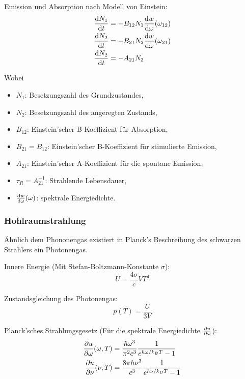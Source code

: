 			\noindent
			Emission und Absorption nach Modell von Einstein:
			\begin{equation}
				\begin{aligned}
					\frac{\mathrm{d} N_1}{\mathrm{d} t} &= -B_{12}N_1 \frac{\mathrm{d} w}{\mathrm{d} \omega}(\omega_{12}) \\
					\frac{\mathrm{d} N_2}{\mathrm{d} t} &= -B_{21}N_2 \frac{\mathrm{d} w}{\mathrm{d} \omega}(\omega_{21}) \\
					\frac{\mathrm{d} N_2}{\mathrm{d} t} &= -A_{21}N_2\\
				\end{aligned}
			\end{equation}

			\noindent
			Wobei
			\begin{itemize}
  				\setlength\itemsep{0pt}
				\item[] $N_1$: Besetzungszahl des Grundzustandes,
				\item[] $N_2$: Besetzungszahl des angeregten Zustands,
				\item[] $B_{12}$: Einstein'scher B-Koeffizient für Absorption,
				\item[] $B_{21} = B_{12}$: Einstein'scher B-Koeffizient für stimulierte Emission,
				\item[] $A_{21}$: Einstein'scher A-Koeffizient für die spontane Emission,
				\item[] $\tau_{R}=A_{21}^{-1}$: Strahlende Lebensdauer,
				\item[] $\frac{\mathrm{d} w}{\mathrm{d} \omega}(\omega)$: spektrale Energiedichte.
			\end{itemize}

		\subsubsection{Hohlraumstrahlung}
			\noindent
			Ähnlich dem Phononengas existiert in Planck's Beschreibung des schwarzen Strahlers ein Photonengas. \vsp

			\noindent
			Innere Energie (Mit Stefan-Boltzmann-Konstante $\sigma$):
			\begin{equation}
				U = \frac{4\sigma}{c} V T^4
			\end{equation}

			\noindent
			Zustandsgleichung des Photonengas:
			\begin{equation}
				p(T) = \frac{U}{3V}
			\end{equation}

			\noindent
			Planck'sches Strahlungsgesetz (Für die spektrale Energiedichte $\frac{\partial u}{\partial \omega}$):
			\begin{equation}
					\begin{aligned}
							\frac{\partial u}{\partial \omega}(\omega,T) &= \frac{\hbar \omega^3}{\pi^2 c^3} \frac{1}{e^{\hbar \omega / k_B T} - 1} \\
							\frac{\partial u}{\partial \nu} (\nu, T) &= \frac{8 \pi h \nu^3}{c^3} \frac{1}{e^{h \nu / k_B T} - 1} \\
					\end{aligned}
			\end{equation}

